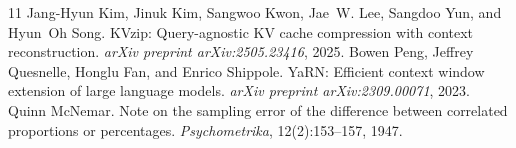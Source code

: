 \documentclass[10pt,twocolumn]{article}
\begin{document}
\begin{thebibliography}{11}
 Jang-Hyun Kim, Jinuk Kim, Sangwoo Kwon, Jae~W. Lee, Sangdoo Yun, and Hyun~Oh Song. \newblock KVzip: Query-agnostic KV cache compression with context reconstruction. \newblock \emph{arXiv preprint arXiv:2505.23416}, 2025.
 Bowen Peng, Jeffrey Quesnelle, Honglu Fan, and Enrico Shippole. \newblock YaRN: Efficient context window extension of large language models. \newblock \emph{arXiv preprint arXiv:2309.00071}, 2023.
 Quinn McNemar. \newblock Note on the sampling error of the difference between correlated proportions or percentages. \newblock \emph{Psychometrika}, 12(2):153--157, 1947.
\end{thebibliography}
\end{document}
